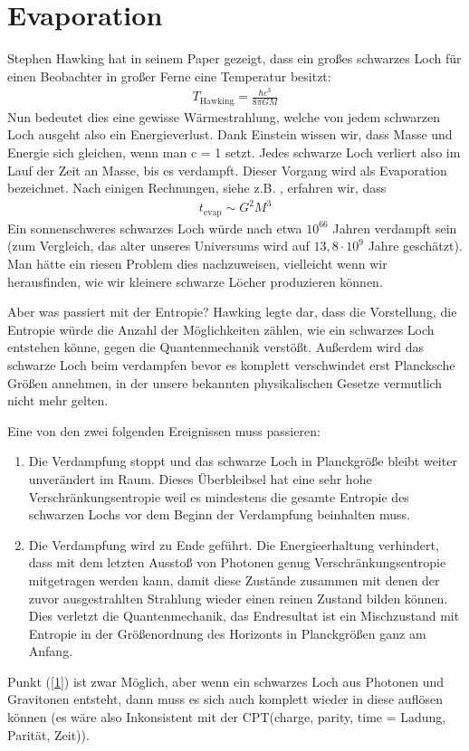 \documentclass[ngerman]{scrartcl}
\begin{document}
\section{Evaporation}
Stephen Hawking hat in seinem Paper \cite{ParticleCreation} gezeigt, dass ein großes schwarzes Loch für einen Beobachter in großer Ferne eine Temperatur besitzt:
	\begin{align}
		T_{\text{Hawking}} = \frac{\hbar c^3}{8 \pi GM}
	\end{align}
Nun bedeutet dies eine gewisse Wärmestrahlung, welche von jedem schwarzen Loch ausgeht also ein Energieverlust. Dank Einstein wissen wir, dass Masse und Energie sich gleichen, wenn man c = 1 setzt. Jedes schwarze Loch verliert also im Lauf der Zeit an Masse, bis es verdampft. Dieser Vorgang wird als Evaporation bezeichnet. Nach einigen Rechnungen, siehe z.B. \cite{JerusalemsLectures}, erfahren wir, dass
	\begin{align}
		t_{\text{evap}} \sim G^2 M^3
	\end{align}
Ein sonnenschweres schwarzes Loch würde nach etwa $10^{66}$ Jahren verdampft sein (zum Vergleich, das alter unseres Universums wird auf $13,8 \cdot 10^{9}$ Jahre geschätzt). Man hätte ein riesen Problem dies nachzuweisen, vielleicht wenn wir herausfinden, wie wir kleinere schwarze Löcher produzieren können. 

Aber was passiert mit der Entropie?
Hawking \cite{BreakdownGravitationalCollapse} legte dar, dass die Vorstellung, die Entropie würde die Anzahl der Möglichkeiten zählen, wie ein schwarzes Loch entstehen könne, gegen die Quantenmechanik verstößt.
Außerdem wird das schwarze Loch beim verdampfen bevor es komplett verschwindet erst Plancksche Größen annehmen, in der unsere bekannten physikalischen Gesetze vermutlich nicht mehr gelten. 

Eine von den zwei folgenden Ereignissen muss passieren:
	\begin{enumerate}[(1)]
		\item Die Verdampfung stoppt und das schwarze Loch in Planckgröße bleibt weiter unverändert im Raum. Dieses Überbleibsel hat eine sehr hohe Verschränkungsentropie weil es mindestens die gesamte Entropie des schwarzen Lochs vor dem Beginn der Verdampfung beinhalten muss. \label{1}
		
		\item Die Verdampfung wird zu Ende geführt. Die Energieerhaltung verhindert, dass mit dem letzten Ausstoß von Photonen genug Verschränkungsentropie mitgetragen werden kann, damit diese Zustände zusammen mit denen der zuvor ausgestrahlten Strahlung wieder einen reinen Zustand bilden können. Dies verletzt die Quantenmechanik, das Endresultat ist ein Mischzustand mit Entropie in der Größenordnung des Horizonts in Planckgrößen ganz am Anfang.  \label{2}
	\end{enumerate}
Punkt (\ref{1}) ist zwar Möglich, aber wenn ein schwarzes Loch aus Photonen und Gravitonen entsteht, dann muss es sich auch komplett wieder in diese auflösen können (es wäre also Inkonsistent mit der CPT(charge, parity, time = Ladung, Parität, Zeit)).
\end{document}
